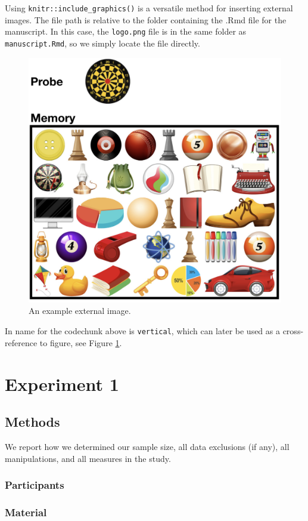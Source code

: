 \documentclass[
  english,
  man]{apa6}
\begin{document}
Using \texttt{knitr::include\_graphics()} is a versatile method for inserting external images. The file path is relative to the folder containing the .Rmd file for the manuscript. In this case, the \texttt{logo.png} file is in the same folder as \texttt{manuscript.Rmd}, so we simply locate the file directly.

\begin{figure}
\includegraphics[width=0.5\linewidth]{external_image} \caption{An example external image.}\label{fig:vertical}
\end{figure}

In name for the codechunk above is \texttt{vertical}, which can later be used as a cross-reference to figure, see Figure \ref{fig:vertical}.

\hypertarget{experiment-1}{%
\section{Experiment 1}\label{experiment-1}}

\hypertarget{methods}{%
\subsection{Methods}\label{methods}}

We report how we determined our sample size, all data exclusions (if any), all manipulations, and all measures in the study.

\hypertarget{participants}{%
\subsubsection{Participants}\label{participants}}

\hypertarget{material}{%
\subsubsection{Material}\label{material}}
\end{document}
